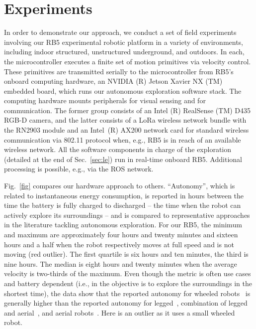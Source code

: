 \documentclass[letterpaper,10pt,conference,twoside]{IEEEtran}
\theoremstyle{definition}
\begin{document}
\section{Experiments}
\label{sec:fe}
\noindent
In order to demonstrate %
our approach, we conduct a set of 
field experiments %
involving our RB5 experimental robotic platform %
in a variety of environments, including indoor structured, unstructured underground, and outdoors. In each, the microcontroller executes a finite set of motion primitives via velocity control. These primitives are transmitted serially to the microcontroller 
from RB5's onboard computing hardware, an NVIDIA (R) Jetson Xavier NX (TM) embedded board, which runs our autonomous %
exploration software stack. %
The computing hardware mounts peripherals for visual sensing and for communication. The former group consists of %
an Intel (R) RealSense (TM) D435 RGB-D camera, and the latter 
consists 
of a LoRa wireless network bundle with the RN2903 module and an Intel~(R) AX200 network card for standard wireless communication via 802.11 protocol when, e.g., RB5 is in reach of an available wireless network.
%
All the software components in charge of the exploration %
(detailed at the end of Sec.~\ref{sec:le}) run in real-time onboard RB5. Additional processing is possible, e.g., %
via the ROS network.

Fig.~\ref{fig} compares our hardware approach to others. 
``Autonomy'', which is related to instantaneous energy consumption, is reported in hours between the time the battery is fully charged to discharged -- the time when the robot can actively explore its surroundings -- and is compared to representative approaches in the literature tackling autonomous exploration. For our RB5, the minimum and maximum are approximately four hours and twenty minutes and sixteen hours and a half when the robot respectively moves at full speed and is not moving (red outlier). The first quartile is six hours and ten minutes, the third is nine hours. The median is eight hours and twenty minutes when the average velocity is two-thirds of the maximum. Even though the metric is often use cases and battery dependent (i.e., in \cite{roucek2020darpa,tranzatto2022cerberus} the objective is to explore the surroundings in the shortest time), the data show that the reported autonomy for wheeled robots~\cite{muller2021openbot,roucek2020darpa,surmann2003autonomous} is generally higher than the reported autonomy for legged~\cite{tranzatto2022cerberus}, combination of legged and aerial~\cite{kulkarni2022autonomous}, and aerial robots~\cite{schmid2020efficient}.
Here \cite{muller2021openbot} is an outlier as it uses a small wheeled robot.
\end{document}
